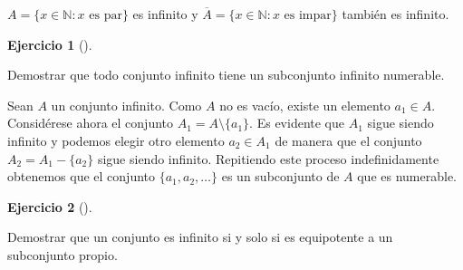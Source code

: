 \documentclass[
  a4paper,
]{scrreport}
\theoremstyle{definition}
\newtheorem{exercise}{Ejercicio}[chapter]
\theoremstyle{remark}
\begin{document}
\begin{tcolorbox}[enhanced jigsaw, colframe=quarto-callout-tip-color-frame, colbacktitle=quarto-callout-tip-color!10!white, opacitybacktitle=0.6, left=2mm, toptitle=1mm, coltitle=black, title=\textcolor{quarto-callout-tip-color}{\faLightbulb}\hspace{0.5em}{Solución}, leftrule=.75mm, opacityback=0, toprule=.15mm, colback=white, titlerule=0mm, arc=.35mm, rightrule=.15mm, bottomrule=.15mm, breakable, bottomtitle=1mm]

\(A=\{x\in\mathbb{N}: x \mbox{ es par}\}\) es infinito y
\(\overline A=\{x\in\mathbb{N}: x \mbox{ es impar}\}\) también es
infinito.

\end{tcolorbox}

\begin{exercise}[]\protect\hypertarget{exr-subconjunto-infinito-numerable}{}\label{exr-subconjunto-infinito-numerable}

Demostrar que todo conjunto infinito tiene un subconjunto infinito
numerable.

\end{exercise}

\begin{tcolorbox}[enhanced jigsaw, colframe=quarto-callout-tip-color-frame, colbacktitle=quarto-callout-tip-color!10!white, opacitybacktitle=0.6, left=2mm, toptitle=1mm, coltitle=black, title=\textcolor{quarto-callout-tip-color}{\faLightbulb}\hspace{0.5em}{Solución}, leftrule=.75mm, opacityback=0, toprule=.15mm, colback=white, titlerule=0mm, arc=.35mm, rightrule=.15mm, bottomrule=.15mm, breakable, bottomtitle=1mm]

Sean \(A\) un conjunto infinito. Como \(A\) no es vacío, existe un
elemento \(a_1\in A\). Considérese ahora el conjunto
\(A_1 = A\setminus \{a_1\}\). Es evidente que \(A_1\) sigue siendo
infinito y podemos elegir otro elemento \(a_2\in A_1\) de manera que el
conjunto \(A_2=A_1-\{a_2\}\) sigue siendo infinito. Repitiendo este
proceso indefinidamente obtenemos que el conjunto
\(\{a_1, a_2, \ldots\}\) es un subconjunto de \(A\) que es numerable.

\end{tcolorbox}

\begin{exercise}[]\protect\hypertarget{exr-conjunto-equipotente-subconjunto}{}\label{exr-conjunto-equipotente-subconjunto}

Demostrar que un conjunto es infinito si y solo si es equipotente a un
subconjunto propio.

\end{exercise}
\end{document}

